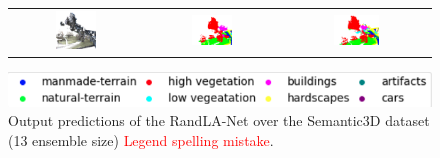 \begin{figure}[h!]
\begin{tabular}{ccc}
            \includegraphics[width=0.33\textwidth, height=0.18\textheight]{images/seg_output/sem3d_seg_output/3_RGB.pdf} &
            \includegraphics[width=0.33\textwidth, height=0.18\textheight]{images/seg_output/sem3d_seg_output/3_GT.pdf}& 
            \includegraphics[width=0.33\textwidth, height=0.18\textheight]{images/seg_output/sem3d_seg_output/3_Pred.pdf}\\
        \end{tabular}
        \includegraphics[scale=0.65]{images/legend.png}
        \caption{Output predictions of the RandLA-Net over the Semantic3D dataset (13 ensemble size) \textcolor{red}{Legend spelling mistake}.}
        \label{fig:deepensemble_vis_sem3d}
    \end{figure}

    
